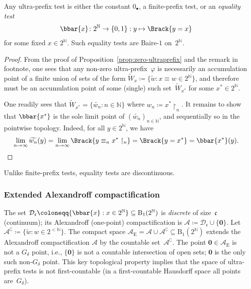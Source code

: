 \begin{proposition}\label{prop:ultra-prefixes}
    Any ultra-prefix test is either the constant $0_{\bullet}$, a finite-prefix test, or an \emph{equality test}
    \begin{equation*}
        \bbar{x}\colon 2^{\mathbb{N}}\to\{0,1\}: y\mapsto \Brack{y = x}
    \end{equation*}
    for some fixed $x\in 2^{\mathbb{N}}$.
    Such equality tests are Baire-$1$ on~$2^{\mathbb{N}}$.
\end{proposition}

\begin{proof}
    From the proof of Proposition~\ref{prop:zero-ultraprefix} and the remark in footnote, one sees that any non-zero ultra-prefix~$\varphi$ is necessarily an accumulation point of a finite union of sets of the form $\widetilde{W}_x \coloneq \{\widetilde{w}: x\equiv w\in 2^{\mathbb{N}}\}$, and therefore must be an accumulation point of some (single) such set~$\widetilde{W}_{\!x^{*}}$ for some $x^{*}\in 2^{\mathbb{N}}$.

    One readily sees that $\widetilde{W}_{\!x^{*}} = \{\widetilde{w_n}: n\in \mathbb{N}\}$ where $w_n \coloneqq x^{*}\restriction_n$.
    It remains to show that $\bbar{x^{*}}$ is the sole limit point of $(\widetilde{w_n})_{n\in \mathbb{N}}$, and sequentially so in the pointwise topology.
    Indeed, for all $y\in 2^{\mathbb{N}}$, we have
    \begin{equation*}
        \lim_{n\to\infty}\widetilde{w_n}(y)=\lim_{n\rightarrow\infty}\Brack{y\equiv_nx^{*}\restriction_n}=\Brack{y= x^{*}}=\bbar{x^{*}}(y).\qedhere
    \end{equation*}

\end{proof}

Unlike finite-prefix tests, equality tests are discontinuous.

\subsubsection{Extended Alexandroff compactification}\label{sec:extended-alexandroff}
The set $\mathcal{D}_{\mathfrak{c}}\coloneqq\{\bbar{x}: x\in 2^{\mathbb{N}}\} \subseteq \mathrm{B}_1(2^{\mathbb{N}})$ is \emph{discrete} of size~$\mathfrak{c}$ (continuum);
its Alexandroff (one-point) compactification is $\mathcal{A}\coloneqq \mathcal{D}_{\mathfrak{c}}\cup\{\mathbf{0}\}$.
Let $\mathcal{A}^{\complement}\coloneqq\{\widetilde{w}: w\in 2^{<\mathbb{N}}\}$.
The compact space $\mathcal{A}_{\mathrm{E}} = \mathcal{A}\cup \mathcal{A}^{\complement} \subseteq \mathrm{B}_1(2^{\mathbb{N}})$ extends the Alexandroff compactification $\mathcal{A}$ by the countable set~$\mathcal{A}^{\complement}$.
The point $\mathbf{0}\in \mathcal{A}_{\mathrm{E}}$ is not a $G_\delta$ point, i.e., $\{\mathbf{0}\}$ is not a countable intersection of open sets;
$\mathbf{0}$ is the only such non-$G_\delta$ point.
This key topological property implies that the space of ultra-prefix tests is not first-countable
(in a first-countable Hausdorff space all points are~$G_\delta$). 